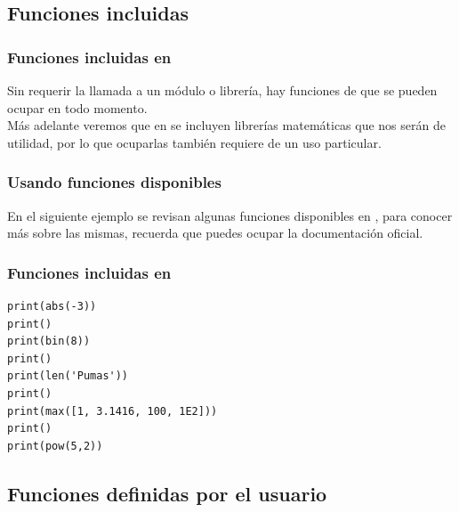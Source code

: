 \documentclass[12pt]{beamer}
\begin{document}
\subsection{Funciones incluidas}

\begin{frame}[fragile]
\frametitle{Funciones incluidas en \python}
Sin requerir la llamada a un módulo o librería, hay funciones de \python{} que se pueden ocupar en todo momento.
\\
\bigskip
\pause
Más adelante veremos que en \python{} se incluyen librerías matemáticas que nos serán de utilidad, por lo que ocuparlas también requiere de un uso particular.
\end{frame}
\begin{frame}
\frametitle{Usando funciones disponibles}
En el siguiente ejemplo se revisan algunas funciones disponibles en \python, \pause para conocer más sobre las mismas, recuerda que puedes ocupar la documentación oficial.
\end{frame}
\begin{frame}[fragile]
\frametitle{Funciones incluidas en \python}
\begin{lstlisting}[caption=Funciones incluidas]
print(abs(-3))
print()
print(bin(8))
print()
print(len('Pumas'))
print()
print(max([1, 3.1416, 100, 1E2]))
print()
print(pow(5,2))
\end{lstlisting}
\end{frame}

\subsection{Funciones definidas por el usuario}
\end{document}
